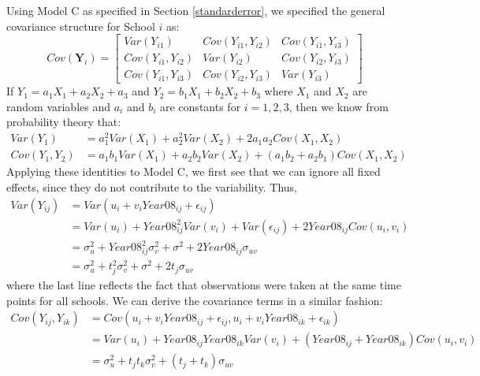 \documentclass[
]{krantz}
\begin{document}
Using Model C as specified in Section \ref{standarderror}, we specified the general covariance structure for School \(i\) as:
\[ Cov(\mathbf{Y}_i) =  \left[
          \begin{array}{cccc}
            Var(Y_{i1}) & Cov(Y_{i1},Y_{i2}) & Cov(Y_{i1},Y_{i3}) \\
            Cov(Y_{i1},Y_{i2}) & Var(Y_{i2}) & Cov(Y_{i2},Y_{i3}) \\
            Cov(Y_{i1},Y_{i3}) & Cov(Y_{i2},Y_{i3}) & Var(Y_{i3})
          \end{array} \right] \]
If \(Y_1 = a_1 X_1 + a_2 X_2 + a_3\) and \(Y_2 = b_1 X_1 + b_2 X_2 + b_3\) where \(X_1\) and \(X_2\) are random variables and \(a_i\) and \(b_i\) are constants for \(i=1,2,3\), then we know from probability theory that:
\begin{align*}
Var(Y_1) & = a^{2}_{1} Var(X_1) + a^{2}_{2} Var(X_2) + 2 a_1 a_2 Cov(X_1,X_2) \\
Cov(Y_1,Y_2) & = a_1 b_1 Var(X_1) + a_2 b_2 Var(X_2) + (a_1 b_2 + a_2 b_1) Cov(X_1,X_2)
\end{align*}
\noindent Applying these identities to Model C, we first see that we can ignore all fixed effects, since they do not contribute to the variability. Thus,
\begin{align*}
Var(Y_{ij}) & = Var(u_{i}+v_{i}\textstyle{Year08}_{ij}+\epsilon_{ij}) \\
 & = Var(u_{i}) + \textstyle{Year08}^{2}_{ij} Var(v_{i}) + Var(\epsilon_{ij}) + 2\textstyle{Year08}_{ij} Cov(u_{i},v_{i}) \\
 & = \sigma_{u}^{2} + \textstyle{Year08}^{2}_{ij} \sigma_{v}^{2} + \sigma^{2} + 2\textstyle{Year08}_{ij}\sigma_{uv} \\
 & = \sigma_{u}^{2} + t^{2}_{j} \sigma_{v}^{2} + \sigma^{2} + 2t_{j}\sigma_{uv}
\end{align*}
\noindent where the last line reflects the fact that observations were taken at the same time points for all schools. We can derive the covariance terms in a similar fashion:
\begin{align*}
Cov(Y_{ij},Y_{ik}) & = Cov(u_{i}+ v_{i}\textstyle{Year08}_{ij}+\epsilon_{ij}, u_{i}+v_{i}\textstyle{Year08}_{ik}+\epsilon_{ik}) \\
 & = Var(u_{i}) + \textstyle{Year08}_{ij}\textstyle{Year08}_{ik} Var(v_{i}) + (\textstyle{Year08}_{ij} + \textstyle{Year08}_{ik}) Cov(u_{i},v_{i}) \\
 & = \sigma_{u}^{2} + t_{j}t_{k} \sigma_{v}^{2} + (t_{j}+t_{k})\sigma_{uv}
\end{align*}
\end{document}

